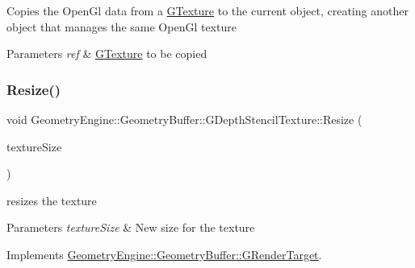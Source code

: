 Copies the Open\+Gl data from a \mbox{\hyperlink{class_geometry_engine_1_1_geometry_buffer_1_1_g_texture}{G\+Texture}} to the current object, creating another object that manages the same Open\+Gl texture 
\begin{DoxyParams}{Parameters}
{\em ref} & \mbox{\hyperlink{class_geometry_engine_1_1_geometry_buffer_1_1_g_texture}{G\+Texture}} to be copied \\
\hline
\end{DoxyParams}
\mbox{\label{class_geometry_engine_1_1_geometry_buffer_1_1_g_depth_stencil_texture_a692ca73521e51be802c981ab05029369}} 
\subsubsection{\texorpdfstring{Resize()}{Resize()}}
{\footnotesize\ttfamily void Geometry\+Engine\+::\+Geometry\+Buffer\+::\+G\+Depth\+Stencil\+Texture\+::\+Resize (\begin{DoxyParamCaption}\item[{const Q\+Vector2D \&}]{texture\+Size }\end{DoxyParamCaption})\hspace{0.3cm}{\ttfamily [virtual]}}

resizes the texture 
\begin{DoxyParams}{Parameters}
{\em texture\+Size} & New size for the texture \\
\hline
\end{DoxyParams}


Implements \mbox{\hyperlink{class_geometry_engine_1_1_geometry_buffer_1_1_g_render_target_ac1e54f456408b53de44fe10116d649dd}{Geometry\+Engine\+::\+Geometry\+Buffer\+::\+G\+Render\+Target}}.

\mbox{\label{class_geometry_engine_1_1_geometry_buffer_1_1_g_depth_stencil_texture_aa4b676746b13f4ea748450ea19ca711a}} 
